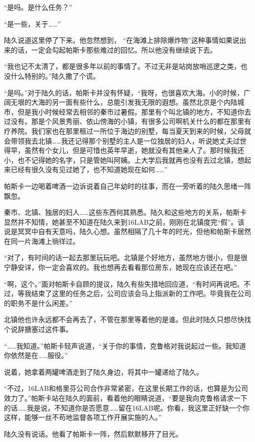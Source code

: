 “是吗。是什么任务？”

“是一些，关于……”

陆久说道这里停了下来。他忽然想到， “在海滩上排除爆炸物”这种事情如果说出来的话，一定会勾起帕斯卡那些难过的回忆。所以他没有继续说下去。

“我也记不太清了，都是很多年以前的事情了。不过无非是站岗放哨巡逻之类，也没什么特别的。”陆久撒了个谎。

“是吗。”对于陆久的话，帕斯卡并没有怀疑，“我呀，也很喜欢大海。小的时候，广阔无垠的大海的另一面有些什么，总能引发我无限的遐想。虽然北京是个内陆城市，但是我小时候经常去相邻的秦市过暑假。那里有个叫北镇的地方，不知道你去过没有。那是个风景秀丽、依山傍海的小镇，有很多公司啊机关什么的都在那里有疗养院。我们家也在那里租过一所位于海边的别墅，每当夏天到来的时候，父母就会带领我去北镇……我还记得那个别墅的主人是一位独居的妇人，听说她丈夫过世得早，虽然有个女儿，但是可惜也英年早逝，她就没有其他亲人了。那时候我还小，也不记得她的名字，只是管她叫阿姨。上大学后我就再也没有去过北镇，想起来已经有很久没有见过她了，也不知道她现在如何……”

帕斯卡一边喝着啤酒一边诉说着自己年幼时的往事，而在一旁听着的陆久思绪一阵飘忽。

秦市、北镇、独居的妇人……这些东西何其熟悉。陆久和这些地方的关系，帕斯卡显然并不知情，她甚至不知道在陆久来到16LAB之前，刚刚在北镇度完“假”。该说是冥冥中自有天意吗，陆久心想。虽然相隔了几十年的时光，但他和帕斯卡居然在同一片海滩上徜徉过。

“对了，有时间的话一起去那里玩玩吧。北镇是个好地方，虽然地方很小，但是很宁静安详，你一定会喜欢的。我也想再去看看那位房东，她现在应该还在吧。”

“啊，这个。”面对帕斯卡自顾的提议，陆久有些失措地回应道，“有时间再说吧。不过，等我结束了这里的任务之后，公司应该会马上指派新的工作吧。毕竟我在公司的职务不是什么闲差。”

北镇他也许永远都不会再去了，不管在那里等着他的是谁。但此时陆久只想尽快找个说辞搪塞过这件事。

“……我知道。”帕斯卡轻声说道，“关于你的事情，克鲁格对我说起过一些。我知道你依然是在……服役。”

说着，她拿着两罐啤酒走到了陆久身边，将其中一罐递给了陆久。

“不过，16LAB和格里芬公司合作非常紧密，在这里长期工作的话，也算是为公司效力了。”帕斯卡站在陆久的面前，看着他的眼睛说道，“要是我向克鲁格请求一下的话……我是说，不知道你是否愿意……留在16LAB呢。你看，我这里正好缺一个你这样，能够一丝不苟地监督各项工作开展实施的人。”

陆久没有说话。他看了帕斯卡一阵，然后默默移开了目光。

